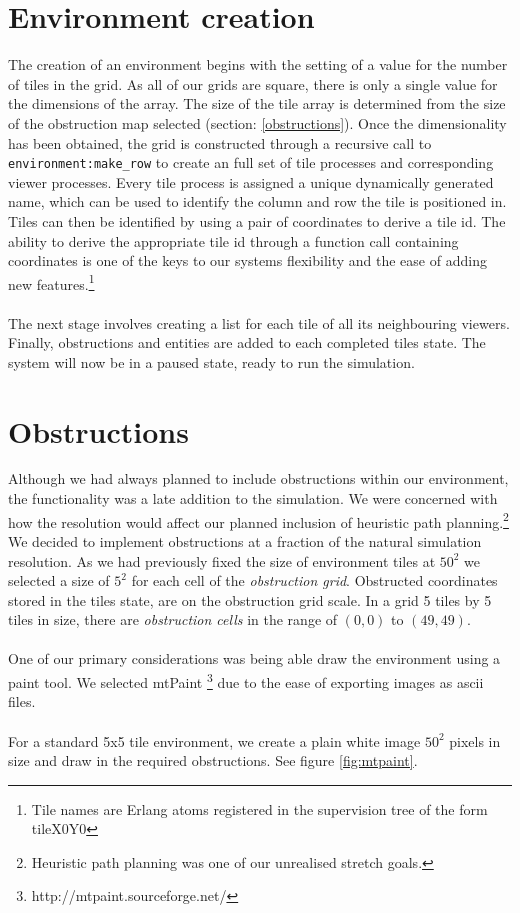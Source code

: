\documentclass[10pt, a4paper, conference, compsocconf]{IEEEtran}
\begin{document}
\section{Environment creation \label{environment_creation}}
The creation of an environment begins with the setting of a value for the number of tiles in the grid. As all of our grids are square, there is only a single value for the dimensions of the array. The size of the tile array is determined from the size of the obstruction map selected (section: \ref{obstructions}). Once the dimensionality has been obtained, the grid is constructed through a recursive call to \verb+environment:make_row+ to create an full set of tile processes and corresponding viewer processes. Every tile process is assigned a unique dynamically generated name, which can be used to identify the column and row the tile is positioned in. Tiles can then be identified by using a pair of coordinates to derive a tile id. The ability to derive the appropriate tile id through a function call containing coordinates is one of the keys to our systems flexibility and the ease of adding new features.\footnote{Tile names are Erlang atoms registered in the supervision tree of the form tileX0Y0}\\
\\
The next stage involves creating a list for each tile of all its neighbouring viewers. Finally, obstructions and entities are added to each completed tiles state. The system will now be in a paused state, ready to run the simulation.\\

\section{Obstructions \label{obstructions}}
Although we had always planned to include obstructions within our environment, the functionality was a late addition to the simulation. We were concerned with how the resolution would affect our planned inclusion of heuristic path planning.\footnote{Heuristic path planning was one of our unrealised stretch goals.} We decided to implement obstructions at a fraction of the natural simulation resolution. As we had previously fixed the size of environment tiles at \(50^2\) we selected a size of \(5^2\) for each cell of the \emph{obstruction grid}. Obstructed coordinates stored in the tiles state, are on the obstruction grid scale. In a grid 5 tiles by 5 tiles in size, there are \emph{obstruction cells} in the range of \( (0,0) \) to \( (49,49) \).\\
\\
One of our primary considerations was being able draw the environment using a paint tool. We selected mtPaint \footnote{http://mtpaint.sourceforge.net/} due to the ease of exporting images as ascii files.\\
\\
For a standard 5x5 tile environment, we create a plain white image \(50^2\) pixels in size and draw in the required obstructions. See figure \ref{fig:mtpaint}.\\
\end{document}
